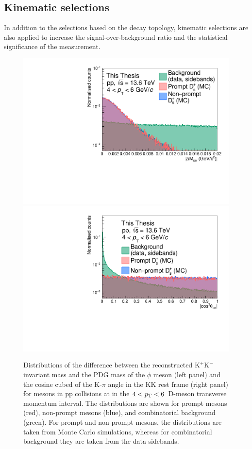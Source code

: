 \subsection{Kinematic selections}
In addition to the selections based on the decay topology, kinematic selections are also applied to increase the signal-over-background ratio and the statistical significance of the measurement.
\begin{figure}[tb]
    \centering
    \includegraphics[width=0.48\linewidth]{Figures/Chapter 4/DeltaMassKK.pdf}
    \includegraphics[width=0.48\linewidth]{Figures/Chapter 4/AbsCos3PiK.pdf}
    \caption{Distributions of the difference between the reconstructed $\mathrm{K^+K^-}$ invariant mass and the PDG mass of the $\phi$ meson (left panel) and the cosine cubed of the K-$\pi$ angle in the KK rest frame (right panel) for \ds mesons in pp collisions at \mbox{\thirteen} in the $4 < p_\mathrm{T} < 6$~\gevc D-meson transverse momentum interval. The distributions are shown for prompt \ds mesons (red), non-prompt \ds mesons (blue), and combinatorial background (green). For prompt and non-prompt \ds mesons, the distributions are taken from Monte Carlo simulations, whereas for combinatorial background they are taken from the data sidebands.}
    \label{fig:DeltaMassPhi}
\end{figure}

